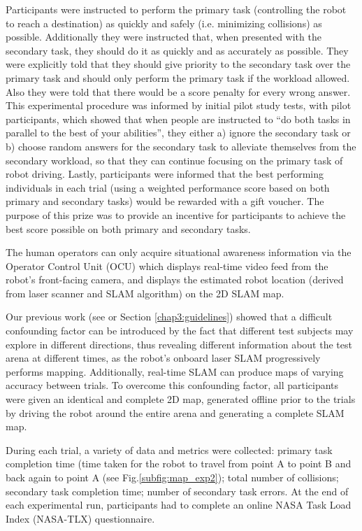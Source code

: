 \documentclass[a4paper,12pt,oneside,openright]{bhamthesis}
\begin{document}
Participants were instructed to perform the primary task (controlling the robot to reach a destination) as quickly and safely (i.e. minimizing collisions) as possible. Additionally they were instructed that, when presented with the secondary task, they should do it as quickly and as accurately as possible. They were explicitly told that they should give priority to the secondary task over the primary task and should only perform the primary task if the workload allowed. Also they were told that there would be a score penalty for every wrong answer. This experimental procedure was informed by initial pilot study tests, with pilot participants, which showed that when people are instructed to ``do both tasks in parallel to the best of your abilities'', they  either a) ignore the secondary task or b) choose random answers for the secondary task to alleviate themselves from the secondary workload, so that they can continue focusing on the primary task of robot driving. Lastly, participants were informed that the best performing individuals in each trial (using a weighted performance score based on both primary and secondary tasks) would be rewarded with a gift voucher. The purpose of this prize was to provide an incentive for participants to achieve the best score possible on both primary and secondary tasks.

The human operators can only acquire situational awareness information via the Operator Control Unit (OCU) which displays real-time video feed from the robot's front-facing camera, and displays the estimated robot location (derived from laser scanner and SLAM algorithm) on the 2D SLAM map.

Our previous work (see \cite{Chiou2015} or Section \ref{chap3:guidelines}) showed that a difficult confounding factor can be introduced by the fact that different test subjects may explore in different directions, thus revealing different information about the test arena at different times, as the robot's onboard laser SLAM progressively performs mapping. Additionally, real-time SLAM can produce maps of varying accuracy between trials. To overcome this confounding factor, all participants were given an identical and complete 2D map, generated offline prior to the trials by driving the robot around the entire arena and generating a complete SLAM map.

During each trial, a variety of data and metrics were collected: primary task completion time (time taken for the robot to travel from point A to point B and back again to point A (see Fig.\ref{subfig:map_exp2}); total number of collisions; secondary task completion time; number of secondary task errors. At the end of each experimental run, participants had to complete an online NASA Task Load Index (NASA-TLX) \cite{Sharek2011}  questionnaire. 
\end{document}
